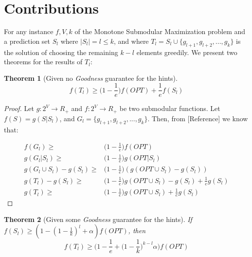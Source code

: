 \documentclass{article}
\newtheorem{theorem}{Theorem}
\begin{document}
\section{Contributions}

For any instance $f, V, k$ of the Monotone Submodular Maximization problem and a prediction set $S_l$ where $|S_l| = l \leq k$, and where $T_l = S_l \cup \{g_{l+1}, g_{l+2}, ..., g_k\}$ is the solution of choosing the remaining $k - l$ elements greedily. We present two theorems for the results of $T_l$:

\begin{theorem}[Given no \emph{Goodness} guarantee for the hints]
    $$f(T_l) \geq \Big(1 - \frac{1}{e}\Big)f(OPT) + \frac{1}{e}f(S_l)$$
\end{theorem}

\begin{proof}
    Let $g: 2 ^ V \rightarrow R_+$ and $f: 2^V \rightarrow R_+$ be two submodular functions. Let $f(S) = g(S | S_l)$, and $G_l = \{g_{l+1}, g_{l+2}, ..., g_{k}\}$. Then, from [Reference] we know that:

    $$
    \begin{aligned}
        f(G_l) \geq & \Big(1 - \frac{1}{e}\Big) f(OPT) \\
        g(G_l | S_l) \geq & \Big(1 - \frac{1}{e}\Big) g(OPT | S_l) \\
        g(G_l \cup S_l) - g(S_l) \geq & \Big(1 - \frac{1}{e}\Big) (g(OPT \cup S_l) - g(S_l)) \\
        g(T_l) - g(S_l) \geq & \Big(1 - \frac{1}{e}\Big) g(OPT \cup S_l) - g(S_l) + \frac{1}{e}g(S_l) \\
        g(T_l) \geq & \Big(1 - \frac{1}{e}\Big) g(OPT \cup S_l)  + \frac{1}{e}g(S_l) 
    \end{aligned}      
    $$
\end{proof}

\begin{theorem}[Given some \emph{Goodness} guarantee for the hints]
     If $f(S_l) \geq (1 - (1 - \frac{1}{k})^l + \alpha) f(OPT)$, then
     $$f(T_l) \geq  \Big(1 - \frac{1}{e} + \Big(1 - \frac{1}{k}\Big)^{k-l}\alpha\Big)f(OPT)$$
\end{theorem}
\end{document}
